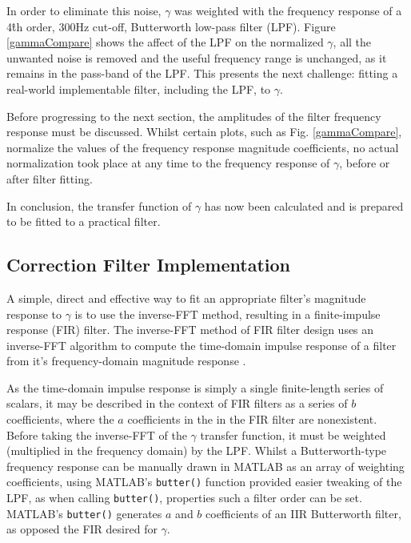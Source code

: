 \documentclass{report}
\begin{document}
            In order to eliminate this noise, $\gamma$ was weighted with the frequency response of a 4\^{th} order, 300Hz cut-off, Butterworth low-pass filter (LPF).
            Figure \ref{gammaCompare} shows the affect of the LPF on the normalized $\gamma$, all the unwanted noise is removed and the useful frequency range is unchanged, as it remains in the pass-band of the LPF.
            This presents the next challenge: fitting a real-world implementable filter, including the LPF, to $\gamma$.

            Before progressing to the next section, the amplitudes of the filter frequency response must be discussed.
            Whilst certain plots, such as Fig. \ref{gammaCompare}, normalize the values of the frequency response magnitude coefficients, no actual normalization took place at any time to the frequency response of $\gamma$, before or after filter fitting.
            
            In conclusion, the transfer function of $\gamma$ has now been calculated and is prepared to be fitted to a practical filter.

        \subsection{Correction Filter Implementation}
            A simple, direct and effective way to fit an appropriate filter's magnitude response to $\gamma$ is to use the inverse-FFT method, resulting in a finite-impulse response (FIR) filter.
            The inverse-FFT method of FIR filter design uses an inverse-FFT algorithm to compute the time-domain impulse response of a filter from it's frequency-domain magnitude response \cite{li2019digital}.
            
            As the time-domain impulse response is simply a single finite-length series of scalars, it may be described in the context of FIR filters as a series of $b$ coefficients, where the $a$ coefficients in the in the FIR filter are nonexistent.
            Before taking the inverse-FFT of the $\gamma$ transfer function, it must be weighted (multiplied in the frequency domain) by the LPF.
            Whilst a Butterworth-type frequency response can be manually drawn in MATLAB as an array of weighting coefficients, using MATLAB's \texttt{butter()} function provided easier tweaking of the LPF, as when calling \texttt{butter()}, properties such a filter order can be set.
            MATLAB's \texttt{butter()} generates $a$ and $b$ coefficients of an IIR Butterworth filter, as opposed the FIR desired for $\gamma$.
\end{document}

